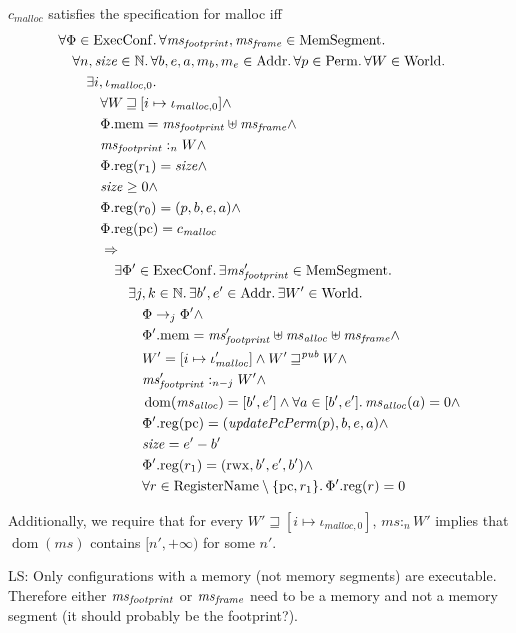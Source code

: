\documentclass[a4paper]{article}
\DeclareMathOperator{\dom}{dom}
\newcommand\lau[1]{{\color{purple} \sf \footnotesize {LS: #1}}\\}
\newcommand{\var}[1]{\mathit{#1}}
\newcommand{\hs}{\var{ms}}
\newcommand{\pcreg}{\mathrm{pc}}
\newcommand{\heap}{\var{mem}}
\newcommand{\plainproj}[1]{\mathrm{#1}}
\newcommand{\memheap}[1][\Phi]{#1.\plainproj{mem}}
\newcommand{\memreg}[1][\Phi]{#1.\plainproj{reg}}
\newcommand{\plainfun}[2]{
  \ifthenelse{\equal{#2}{}}
             {\mathit{#1}}
             {\mathit{#1}(#2)}
}
\newcommand{\updatePcPerm}[1]{\plainfun{updatePcPerm}{#1}}
\newcommand{\future}{\mathbin{\sqsupseteq}}
\newcommand{\futurewk}{\mathbin{\sqsupseteq}^{\var{pub}}}
\newcommand{\heapSat}[3][\heap]{#1 :_{#2} #3}
\newcommand{\codelabel}[1]{\mathit{#1}}
\newcommand{\malloc}{\codelabel{malloc}}
\newcommand{\plaindom}[1]{\mathrm{#1}}
\newcommand{\Addrs}{\plaindom{Addr}}
\newcommand{\ExecConfs}{\plaindom{ExecConf}}
\newcommand{\RegName}{\plaindom{RegisterName}}
\newcommand{\HeapSegments}{\plaindom{MemSegment}}
\newcommand{\nats}{\mathbb{N}}
\newcommand{\Perms}{\plaindom{Perm}}
\newcommand{\Worlds}{\plaindom{World}}
\newcommand{\plainperm}[1]{\mathrm{#1}}
\newcommand{\rwx}{\plainperm{rwx}}
\newcommand{\step}[1][]{\rightarrow_{#1}}
\begin{document}
\begin{specification}[Malloc v.2]
  $c_\malloc$ satisfies the specification for malloc iff
  \begin{align*}
    &\forall \Phi \in \ExecConfs \ldotp \forall \hsfoot, \hsframe \in \HeapSegments \ldotp \\
    &\quad \forall n, \size \in \nats \ldotp \forall b,e,a,m_b,m_e \in \Addrs\ldotp\forall p \in \Perms \ldotp \forall W \in \Worlds \ldotp\\
    &\qquad \exists i, \iota_{\malloc,0} \ldotp \\
    &\qquad \quad \forall W \future [i \mapsto \iota_{\malloc,0}] \land \\
    &\qquad \quad \memheap = \hsfoot \uplus \hsframe \land\\
    &\qquad \quad \heapSat[\hsfoot]{n}{W} \land \\
    &\qquad \quad \memreg(r_1) = \size \land \\
    &\qquad \quad \size \geq 0 \land \\
    &\qquad \quad \memreg(r_0) = (p,b,e,a) \land \\
    &\qquad \quad \memreg(\pcreg) = c_\malloc \\ %
    &\qquad \quad \Rightarrow \\
    &\qquad \qquad\exists \Phi' \in \ExecConfs \ldotp \exists \hsfoot' \in \HeapSegments\ldotp\\
    &\qquad \qquad \quad \exists j,k \in \nats \ldotp \exists b',e'\in \Addrs \ldotp \exists W' \in \Worlds \ldotp \\
    &\qquad \qquad \qquad \Phi \step[j]\Phi' \land \\
    &\qquad \qquad \qquad \memheap[\Phi']=\hsfoot'\uplus \hs_{\var{alloc}} \uplus \hsframe \land\\
    &\qquad \qquad \qquad W' = [i \mapsto \iota_{\malloc}']\land W' \futurewk W \land \\
    &\qquad \qquad \qquad \heapSat[\hsfoot']{n-j}{W'} \land \\
    &\qquad \qquad \qquad \dom(\hs_{\var{alloc}}) = [b',e'] \land \forall a \in [b',e']\ldotp \hs_{\var{alloc}}(a) = 0  \land \\
    &\qquad \qquad \qquad \memreg[\Phi'](\pcreg) = (\updatePcPerm{p},b,e,a) \land \\
    &\qquad \qquad \qquad \size = e'-b' \\
    &\qquad \qquad \qquad \memreg[\Phi'](r_1) = (\rwx,b',e',b') \land \\
    &\qquad \qquad \qquad \forall r \in \RegName \setminus \{\pcreg,r_1\} \ldotp \memreg[\Phi'](r) = 0
  \end{align*}

  Additionally, we require that for every $W' \future [i\mapsto \iota_{\malloc,0}]$, $\heapSat[\hs]{n}{W'}$ implies that $\dom(\hs)$ contains $[n',+\infty)$ for some $n'$.
\end{specification}
\lau{Only configurations with a memory (not memory segments) are executable. Therefore either $\hsfoot$ or $\hsframe$ need to be a memory and not a memory segment (it should probably be the footprint?).}
\end{document}
